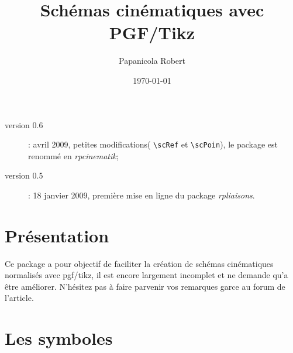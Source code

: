 \documentclass[a4paper,11pt]{article}                      %
\title{Schémas cinématiques avec PGF/Tikz}                                    %
\author{Papanicola Robert}                                   %
\date{\today}                                     %
\begin{document}
\maketitle

\begin{description}
\item[version 0.6]: avril 2009, petites modifications( \verb"\scRef" et \verb"\scPoin"), le package est renommé en \emph{rpcinematik};
\item[version 0.5]: 18 janvier 2009,  première mise en ligne du package \emph{rpliaisons}.
\end{description}

\section{Présentation}

Ce package a pour objectif de faciliter la création de schémas cinématiques normalisés avec pgf/tikz, il est encore largement incomplet et ne demande qu'a être améliorer. N'hésitez pas à faire parvenir vos remarques garce au forum de l'article.


\section{Les symboles}
\end{document}
